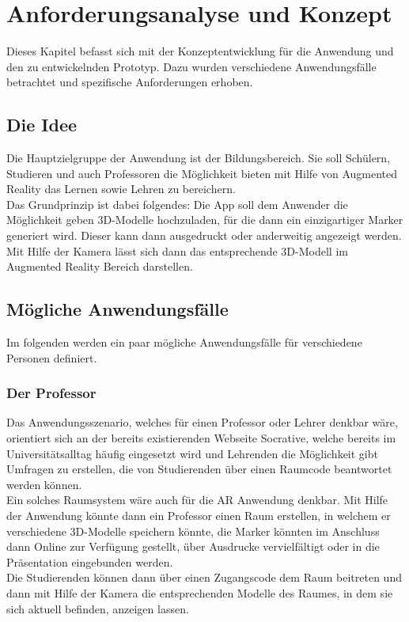 \chapter{Anforderungsanalyse und Konzept}\label{chap:Konzept}
Dieses Kapitel befasst sich mit der Konzeptentwicklung für die Anwendung und den zu entwickelnden Prototyp. Dazu wurden verschiedene Anwendungsfälle betrachtet und spezifische Anforderungen erhoben.

\section{Die Idee}
Die Hauptzielgruppe der Anwendung ist der Bildungsbereich. Sie soll Schülern, Studieren und auch Professoren die Möglichkeit bieten mit Hilfe von Augmented Reality das Lernen sowie Lehren zu bereichern. \\
Das Grundprinzip ist dabei folgendes: Die App soll dem Anwender die Möglichkeit geben 3D-Modelle hochzuladen, für die dann ein einzigartiger Marker generiert wird. Dieser kann dann ausgedruckt oder anderweitig angezeigt werden. Mit Hilfe der Kamera lässt sich dann das entsprechende 3D-Modell im Augmented Reality Bereich darstellen.

\section{Mögliche Anwendungsfälle}
Im folgenden werden ein paar mögliche Anwendungsfälle für verschiedene Personen definiert.

\subsection{Der Professor}
Das Anwendungsszenario, welches für einen Professor oder Lehrer denkbar wäre, orientiert sich an der bereits existierenden Webseite Socrative, welche bereits im Universitätsalltag häufig eingesetzt wird und Lehrenden die Möglichkeit gibt Umfragen zu erstellen, die von Studierenden über einen Raumcode beantwortet werden können. \\
Ein solches Raumsystem wäre auch für die AR Anwendung denkbar.
Mit Hilfe der Anwendung könnte dann ein Professor einen Raum erstellen, in welchem er verschiedene 3D-Modelle speichern könnte, die Marker könnten im Anschluss dann Online zur Verfügung gestellt, über Ausdrucke vervielfältigt oder in die Präsentation eingebunden werden.\\
Die Studierenden können dann über einen Zugangscode dem Raum beitreten und dann mit Hilfe der Kamera die  entsprechenden Modelle des Raumes, in dem sie sich aktuell befinden, anzeigen lassen.

